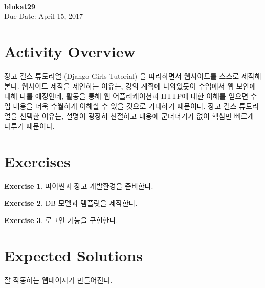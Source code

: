 \documentclass[a4paper, 11pt]{article}
\theoremstyle{definition}
\newtheorem{exercise}{Exercise}
\begin{document}
 \\
         {\phantom{} \hfill \textbf{blukat29}} \\
         {\phantom{} \hfill Due Date: April 15, 2017} \\

\section{Activity Overview}

장고 걸스 튜토리얼 (Django Girls Tutorial) \cite{djangogirls} 을 따라하면서 웹사이트를 스스로 제작해본다.
웹사이트 제작을 제안하는 이유는, 강의 계획에 나와있듯이 수업에서 웹 보안에 대해 다룰 에정인데,
활동을 통해 웹 어플리케이션과 HTTP에 대한 이해를 얻으면 수업 내용을 더욱 수월하게 이해할 수 있을 것으로 기대하기 때문이다.
장고 걸스 튜토리얼을 선택한 이유는, 설명이 굉장히 친절하고 내용에 군더더기가 없이 핵심만 빠르게 다루기 때문이다.

\section{Exercises}

\begin{exercise}

  파이썬과 장고 개발환경을 준비한다.

\end{exercise}

\begin{exercise}

  DB 모델과 템플릿을 제작한다.

\end{exercise}

\begin{exercise}

  로그인 기능을 구현한다.

\end{exercise}

\section{Expected Solutions}

잘 작동하는 웹페이지가 만들어진다.



\end{document}
